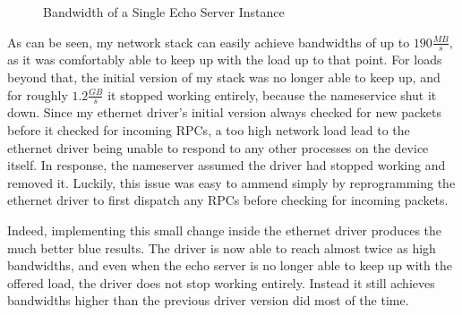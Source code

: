 \begin{figure}[H]
\centering
    \resizebox{\textwidth}{!} {
        
    }
    \caption{Bandwidth of a Single Echo Server Instance}
    \label{fig:bw_echo}
\end{figure}

As can be seen, my network stack can easily achieve bandwidths of up to $190 \frac{MB}{s}$, as it was comfortably able to keep up with the load up to that point. For loads beyond that, the initial version of my stack was no longer able to keep up, and for roughly $1.2 \frac{GB}{s}$ it stopped working entirely, because the nameservice shut it down. Since my ethernet driver's initial version always checked for new packets before it checked for incoming RPCs, a too high network load lead to the ethernet driver being unable to respond to any other processes on the device itself. In response, the nameserver assumed the driver had stopped working and removed it. Luckily, this issue was easy to ammend simply by reprogramming the ethernet driver to first dispatch any RPCs before checking for incoming packets.

Indeed, implementing this small change inside the ethernet driver produces the much better blue results. The driver is now able to reach almost twice as high bandwidths, and even when the echo server is no longer able to keep up with the offered load, the driver does not stop working entirely. Instead it still achieves bandwidths higher than the previous driver version did most of the time.

